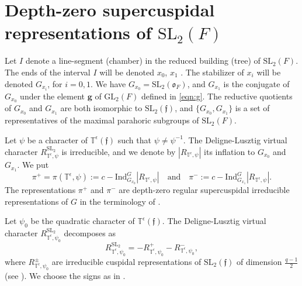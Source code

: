 \documentclass[11pt]{amsart}
\numberwithin{equation}{section}
\def\kF{\mathfrak{f}}
\def\fo{\mathfrak{o}}
\def\Ind{\mathrm{Ind}}
\def\GL{\mathrm{GL}}
\def\SL{\mathrm{SL}}
\def\bbT{\mathbb{T}}
\def\fo{\mathfrak{o}}
\newcommand{\<}{\left\langle}
\renewcommand{\>}{\right\rangle}
\begin{document}
\section{Depth-zero supercuspidal representations of $\SL_2(F)$}  
Let $I$ denote a line-segment (chamber) in the reduced building  (tree) of $\SL_2(F)$.   The ends of the interval $I$ will be denoted $x_0$, $x_1$ .   The stabilizer of $x_i$ will be denoted $G_{x_i}$, for $i=0,1$. We have  $G_{x_0}=\SL_2(\fo_F)$, and  $G_{x_1}$ is the conjugate of $G_{x_0}$ under the element $\mathbf{g}$ of $\GL_2(F)$ defined in \eqref{eqn:g}.
The reductive quotients of $G_{x_0}$ and $G_{x_1}$ are both  isomorphic to  $\SL_2(\kF)$,  and $\{G_{x_0},G_{x_1}\}$ is a set of representatives of the maximal parahoric subgroups of $\SL_2(F)$.


Let $\psi$ be a character of $\bbT^\epsilon(\kF)$ such that $\psi \ne \psi^{-1}$.  The Deligne-Lusztig virtual character $R_{\bbT^\epsilon,\psi}^{\SL_2}$ is irreducible,  and  we denote by $|R_{\bbT^\epsilon,\psi}|$  its inflation
to $G_{x_0}$ and $G_{x_1}$. We put
\begin{equation} \label{eqn:reg}
\pi^+=\pi(\bbT^\epsilon,\psi):= c-\Ind_{G_{x_0}}^G |R_{\bbT^\epsilon,\psi}|\quad\text{and}\quad\pi^-:= c-\Ind_{G_{x_1}}^G |R_{\bbT^\epsilon,\psi}|.
\end{equation}
The representations $\pi^+$ and $\pi^-$  are depth-zero regular supercuspidal  irreducible representations of $G$ in the terminology of \cite{Ka2}.

Let $\psi_0$ be the quadratic character of $\bbT^\epsilon(\kF)$. The Deligne-Lusztig virtual character $R_{\bbT^\epsilon,\psi_0}^{\SL_2}$  decomposes as 
\begin{equation}
R_{\bbT^\epsilon,\psi_0}^{\SL_2}=-R_{\bbT^\epsilon,\psi_0}^+ - R_{\bbT^\epsilon,\psi_0}^-,
\end{equation}
where $R_{\bbT^\epsilon,\psi_0}^\pm$ are irreducible cuspidal representations of $\SL_2(\kF)$ of dimension $\frac{q-1}{2}$ (see \cite[Table~12.1]{DM}). We choose the signs as in \cite[(9.3)]{ADSS}.
\end{document}
